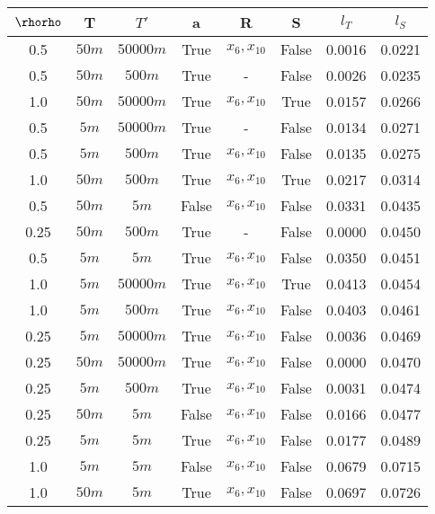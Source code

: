 \begin{tabular}{| c c c | c c c | c c |}
\hline
$\rhorho$ & T & $T'$ & a & R & S & $l_T$ & $l_S$ \\
\hline
0.5 & $50m$ & $50000m$ & True & $x_{6}, x_{10}$ & False & 0.0016 & 0.0221 \\
0.5 & $50m$ & $500m$ & True & - & False & 0.0026 & 0.0235 \\
1.0 & $50m$ & $50000m$ & True & $x_{6}, x_{10}$ & True & 0.0157 & 0.0266 \\
0.5 & $5m$ & $50000m$ & True & - & False & 0.0134 & 0.0271 \\
0.5 & $5m$ & $500m$ & True & $x_{6}, x_{10}$ & False & 0.0135 & 0.0275 \\
1.0 & $50m$ & $500m$ & True & $x_{6}, x_{10}$ & True & 0.0217 & 0.0314 \\
0.5 & $50m$ & $5m$ & False & $x_{6}, x_{10}$ & False & 0.0331 & 0.0435 \\
0.25 & $50m$ & $500m$ & True & - & False & 0.0000 & 0.0450 \\
0.5 & $5m$ & $5m$ & True & $x_{6}, x_{10}$ & False & 0.0350 & 0.0451 \\
1.0 & $5m$ & $50000m$ & True & $x_{6}, x_{10}$ & True & 0.0413 & 0.0454 \\
1.0 & $5m$ & $500m$ & True & $x_{6}, x_{10}$ & False & 0.0403 & 0.0461 \\
0.25 & $5m$ & $50000m$ & True & $x_{6}, x_{10}$ & False & 0.0036 & 0.0469 \\
0.25 & $50m$ & $50000m$ & True & $x_{6}, x_{10}$ & False & 0.0000 & 0.0470 \\
0.25 & $5m$ & $500m$ & True & $x_{6}, x_{10}$ & False & 0.0031 & 0.0474 \\
0.25 & $50m$ & $5m$ & False & $x_{6}, x_{10}$ & False & 0.0166 & 0.0477 \\
0.25 & $5m$ & $5m$ & True & $x_{6}, x_{10}$ & False & 0.0177 & 0.0489 \\
1.0 & $5m$ & $5m$ & False & $x_{6}, x_{10}$ & False & 0.0679 & 0.0715 \\
1.0 & $50m$ & $5m$ & True & $x_{6}, x_{10}$ & False & 0.0697 & 0.0726 \\
\hline
\end{tabular}
